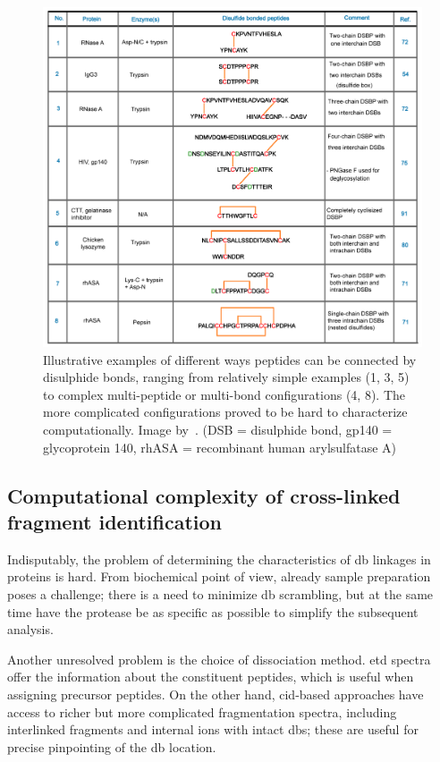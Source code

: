 \begin{figure}
  \centering
  \includegraphics[width=1\linewidth]{img/bond-types.png}
  \caption{Illustrative examples of different ways peptides can be connected by disulphide bonds, ranging from relatively simple examples (1, 3, 5) to complex multi-peptide or multi-bond configurations (4, 8). The more complicated configurations proved to be hard to characterize computationally. Image by~\citet{lakbub2018recent}. (DSB = disulphide bond, gp140 = glycoprotein 140, rhASA = recombinant human arylsulfatase A)}\label{fig:bond-types}
\end{figure}


\subsection{Computational complexity of cross-linked fragment identification}

Indisputably, the problem of determining the characteristics of \gls*{db} linkages in proteins is hard. From biochemical point of view, already sample preparation poses a challenge; there is a need to minimize \gls*{db} scrambling, but at the same time have the protease be as specific as possible to simplify the subsequent analysis.

Another unresolved problem is the choice of dissociation method. \gls*{etd} spectra offer the information about the constituent peptides, which is useful when assigning precursor peptides. On the other hand, \gls*{cid}-based approaches have access to richer but more complicated fragmentation spectra, including interlinked fragments and internal ions with intact \glspl*{db}; these are useful for precise pinpointing of the \gls*{db} location.

